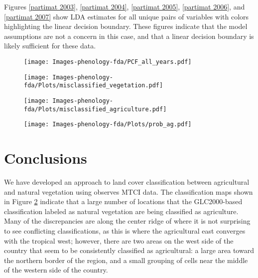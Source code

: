 Figures \ref{partimat 2003}, \ref{partimat 2004}, \ref{partimat 2005}, \ref{partimat 2006}, and \ref{partimat 2007} show LDA estimates for all unique pairs of variables with colors highlighting the linear decision boundary. These figures indicate that the model assumptions are not a concern in this case, and that a linear decision boundary is likely sufficient for these data. 

\begin{figure}
	[htbp] \centering 
	\texttt{[image: Images-phenology-fda/PCF\_all\_years.pdf]}  \label{fig:pcf all years} 
\end{figure}

\begin{figure}
	[htbp] \centering 
	\texttt{[image: Images-phenology-fda/Plots/misclassified\_vegetation.pdf]}  
	\label{fig:misclassified vegetation} 
\end{figure}

\begin{figure}
	[htbp] \centering 
	\texttt{[image: Images-phenology-fda/Plots/misclassified\_agriculture.pdf]}  
	\label{fig:misclassified agriculture} 
\end{figure}

\begin{figure}
	[htbp] \centering 
	\texttt{[image: Images-phenology-fda/Plots/prob\_ag.pdf]}  
	\label{fig:probability map} 
\end{figure}


\label{sec:results}


\section{Conclusions} 
We have developed an approach to land cover classification between agricultural and natural vegetation using observes MTCI data. The classification maps shown in Figure \ref{fig:misclassified vegetation} indicate that a large number of locations that the GLC2000-based classification labeled as natural vegetation are being classified as agriculture. Many of the discrepancies are along the center ridge of where it is not surprising to see conflicting classifications, as this is where the agricultural east converges with the tropical west; however, there are two areas on the west side of the country that seem to be consistently classified as agricultural: a large area toward the northern border of the region, and a small grouping of cells near the middle of the western side of the country. 

